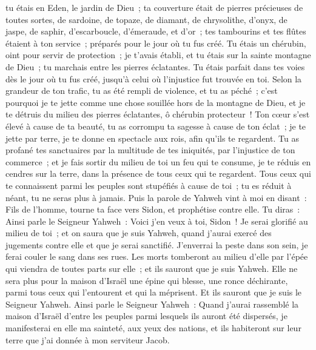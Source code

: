 \begin{multicols}{2}
tu étais en Eden, le jardin de Dieu~; ta couverture était de pierres précieuses de toutes sortes, de sardoine, de topaze, de diamant, de chrysolithe, d'onyx, de jaspe, de saphir, d'escarboucle, d'émeraude, et d'or~; tes tambourins et tes flûtes étaient à ton service~; préparés pour le jour où tu fus créé.
Tu étais un chérubin, oint pour servir de protection~; je t'avais établi, et tu étais sur la sainte montagne de Dieu~; tu marchais entre les pierres éclatantes.
Tu étais parfait dans tes voies dès le jour où tu fus créé, jusqu'à celui où l'injustice fut trouvée en toi.
Selon la grandeur de ton trafic, tu as été rempli de violence, et tu as péché~; c'est pourquoi je te jette comme une chose souillée hors de la montagne de Dieu, et je te détruis du milieu des pierres éclatantes, ô chérubin protecteur~!
Ton cœur s'est élevé à cause de ta beauté, tu as corrompu ta sagesse à cause de ton éclat~; je te jette par terre, je te donne en spectacle aux rois, afin qu'ils te regardent.
Tu as profané tes sanctuaires par la multitude de tes iniquités, par l'injustice de ton commerce~; et je fais sortir du milieu de toi un feu qui te consume, je te réduis en cendres sur la terre, dans la présence de tous ceux qui te regardent.
Tous ceux qui te connaissent parmi les peuples sont stupéfiés à cause de toi~; tu es réduit à néant, tu ne seras plus à jamais.
Puis la parole de Yahweh vint à moi en disant~:
Fils de l'homme, tourne ta face vers Sidon, et prophétise contre elle.
Tu diras~: Ainsi parle le Seigneur Yahweh~: Voici j'en veux à toi, Sidon~! Je serai glorifié au milieu de toi~; et on saura que je suis Yahweh, quand j'aurai exercé des jugements contre elle et que je serai sanctifié.
J'enverrai la peste dans son sein, je ferai couler le sang dans ses rues. Les morts tomberont au milieu d'elle par l'épée qui viendra de toutes parts sur elle~; et ils sauront que je suis Yahweh.
Elle ne sera plus pour la maison d'Israël une épine qui blesse, une ronce déchirante, parmi tous ceux qui l'entourent et qui la méprisent. Et ils sauront que je suis le Seigneur Yahweh.
Ainsi parle le Seigneur Yahweh~: Quand j'aurai rassemblé la maison d'Israël d'entre les peuples parmi lesquels ils auront été dispersés, je manifesterai en elle ma sainteté, aux yeux des nations, et ils habiteront sur leur terre que j'ai donnée à mon serviteur Jacob.

\end{multicols}
